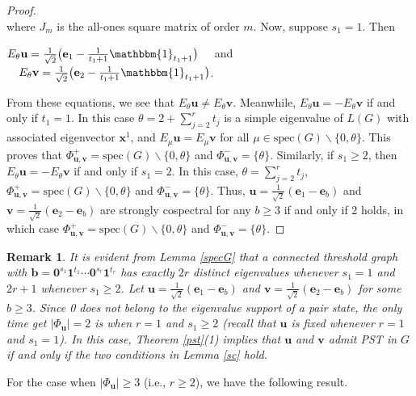 \documentclass[preprint]{elsarticle}
\newcommand{\supp}{{\Phi}}
\newcommand\spec{{\mathrm{spec}}}
\newtheorem{remark}[theorem]{Remark}
\begin{document}
\begin{proof}
\[\]
where $J_m$ is the all-ones square matrix of order $m$. Now, suppose $s_1=1$. Then 
\begin{center}
$E_\theta\mathbf{u}=\frac{1}{\sqrt2}\big(\mathbf{e}_1-\frac{1}{t_1+1}\mathbbm{1}_{t_1+1}\big)\quad $ and $\quad E_\theta\mathbf{v}=\frac{1}{\sqrt2}\big(\mathbf{e}_2-\frac{1}{t_1+1}\mathbbm{1}_{t_1+1}\big)$.
\end{center}
From these equations, we see that $E_\theta\mathbf{u}\neq E_\theta\mathbf{v}$. Meanwhile, $E_\theta\mathbf{u}=- E_\theta\mathbf{v}$ if and only if $t_1=1$. In this case $\theta=2+\sum_{j=2}^rt_j$ is a simple eigenvalue of $L(G)$ with associated eigenvector $\mathbf{x}^{1}$, and $E_\mu\mathbf{u}=E_\mu\mathbf{v}$ for all $\mu\in\spec(G)\backslash\{0,\theta\} $. This proves that $\supp_{\mathbf{u},\mathbf{v}}^+=\spec(G)\backslash\{0,\theta\} $ and $ \supp_{\mathbf{u},\mathbf{v}}^-=\{\theta\}$. Similarly, if $s_1\geq 2$, then $E_\theta\mathbf{u}=- E_\theta\mathbf{v}$ if and only if $s_1=2$. In this case, $\theta=\sum_{j=2}^rt_j$, $\supp_{\mathbf{u},\mathbf{v}}^+=\spec(G)\backslash\{0,\theta\}$ and $ \supp_{\mathbf{u},\mathbf{v}}^-=\{\theta\}$. Thus, $\mathbf{u}=\frac{1}{\sqrt2}(\mathbf{e}_1-\mathbf{e}_b)$ and $\mathbf{v}=\frac{1}{\sqrt2}(\mathbf{e}_2-\mathbf{e}_b)$ are strongly cospectral for any $b\geq 3$ if and only if 2 holds, in which case $\supp_{\mathbf{u},\mathbf{v}}^+=\spec(G)\backslash\{0,\theta\} $ and $ \supp_{\mathbf{u},\mathbf{v}}^-=\{\theta\}$.
\end{proof}

\begin{remark}
\label{r1}
It is evident from Lemma \ref{specG} that a connected threshold graph with $\mathbf{b}=\mathbf{0}^{s_1}\mathbf{1}^{t_1}\cdots \mathbf{0}^{s_r}\mathbf{1}^{t_r}$ has exactly $2r$ distinct eigenvalues whenever $s_1=1$ and $2r+1$ whenever $s_1\geq 2$. Let $\mathbf{u}=\frac{1}{\sqrt2}(\mathbf{e}_1-\mathbf{e}_b)$ and $\mathbf{v}=\frac{1}{\sqrt2}(\mathbf{e}_2-\mathbf{e}_b)$ for some $b\geq 3$. Since 0 does not belong to the eigenvalue support of a pair state, the only time get $|\supp_{\mathbf{u}}|=2$ is when %
$r=1$ and $s_1\geq 2$ (recall that $\mathbf{u}$ is fixed whenever $r=1$ and $s_1=1$). In this case, Theorem \ref{pst}(1) implies that $\mathbf{u}$ and $\mathbf{v}$ admit PST in $G$ if and only if the two conditions in Lemma \ref{sc} hold. 
\end{remark}

For the case when $|\supp_{\mathbf{u}}|\geq 3$ (i.e., $r\geq 2$), we have the following result.
\end{document}
